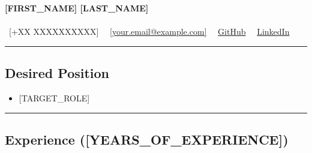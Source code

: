 \documentclass[10pt,letterpaper]{article}
\begin{document}
\begin{center}
    {\LARGE \textbf{[FIRST_NAME] [LAST_NAME]}}\\
    [CITY, COUNTRY]
    \vspace{0.03cm}
    \\
    \raisebox{-0.2\height} {\Large \faPhone} \ [+XX XXXXXXXXXX]
    \hfill \raisebox{-0.2\height}{\Large \faEnvelope} \ \ \href{mailto:[your.email@example.com]}{[your.email@example.com]}
    \hfill \raisebox{-0.2\height}{\Large \faGithub} \ \ \href{[https://github.com/your-username]}{GitHub}
    \hfill \raisebox{-0.2\height}{\Large \faLinkedin} \ \ \href{[https://linkedin.com/in/your-profile]}{LinkedIn}
\end{center}

\hrule
\vspace{-0.5em}
\subsection*{\Large Desired Position}

\begin{itemize}[leftmargin=1em,noitemsep]
    \item {[TARGET_ROLE]}
\end{itemize}

\hrule
\vspace{-1em}
\subsection*{\Large Experience ([YEARS_OF_EXPERIENCE])}
\end{document}
